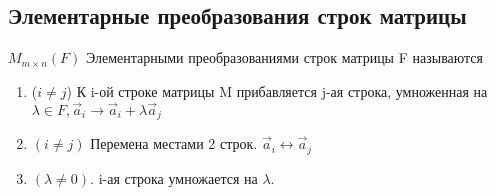 \subsection{Элементарные преобразования строк матрицы}
\begin{definition}
	\(M_{m\times n}(F)\)
	Элементарными преобразованиями строк матрицы F называются 
	\begin{enumerate}
		\item (\(i\ne j\)) К i-ой строке матрицы M прибавляется j-ая строка, умноженная на \(\lambda\in F, \vec a_i \to \vec a_i + \lambda \vec a_j\)
		\item \((i\ne j)\) Перемена местами 2 строк. \(\vec a_i \longleftrightarrow \vec a_j\)
		\item \((\lambda \ne 0)\). i-ая строка умножается на \(\lambda\).
	\end{enumerate}
\end{definition}


